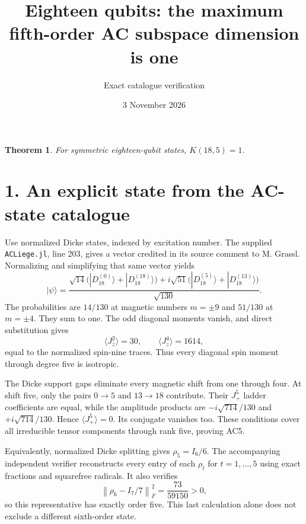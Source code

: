 \documentclass[11pt]{article}
\newtheorem{theorem}{Theorem}
\begin{document}
\title{Eighteen qubits: the maximum fifth-order AC subspace dimension is one}
\author{Exact catalogue verification}
\date{3 November 2026}
\maketitle
\begin{theorem}
For symmetric eighteen-qubit states, $K(18,5)=1$.
\end{theorem}
\section*{1. An explicit state from the AC-state catalogue}
Use normalized Dicke states, indexed by excitation number. The supplied
\texttt{ACLiege.jl}, line 203, gives a vector credited in its source comment
to M. Grassl. Normalizing and simplifying that same vector yields
\[
 |\psi\rangle=\frac{\sqrt{14}\bigl(|D_{18}^{(0)}\rangle+|D_{18}^{(18)}\rangle\bigr)
 +i\sqrt{51}\bigl(|D_{18}^{(5)}\rangle+|D_{18}^{(13)}\rangle\bigr)}{\sqrt{130}}.
\]
The probabilities are $14/130$ at magnetic numbers $m=\pm9$ and
$51/130$ at $m=\pm4$. They sum to one. The odd diagonal moments vanish,
and direct substitution gives
\[
 \langle J_z^2\rangle=30,\qquad \langle J_z^4\rangle=1614,
\]
equal to the normalized spin-nine traces. Thus every diagonal spin moment
through degree five is isotropic.

The Dicke support gaps eliminate every magnetic shift from one through
four. At shift five, only the pairs $0\to5$ and $13\to18$ contribute.
Their $J_+^5$ ladder coefficients are equal, while the amplitude products
are $-i\sqrt{714}/130$ and $+i\sqrt{714}/130$. Hence
$\langle J_+^5\rangle=0$. Its conjugate vanishes too. These conditions
cover all irreducible tensor components through rank five, proving AC5.

Equivalently, normalized Dicke splitting gives $\rho_5=I_6/6$.
The accompanying independent verifier reconstructs every entry of each
$\rho_t$ for $t=1,\ldots,5$ using exact fractions and squarefree radicals.
It also verifies
\[
 \left\|\rho_6-I_7/7\right\|_F^2=\frac{73}{59150}>0,
\]
so this representative has exactly order five. This last calculation
alone does not exclude a different sixth-order state.
\end{document}
